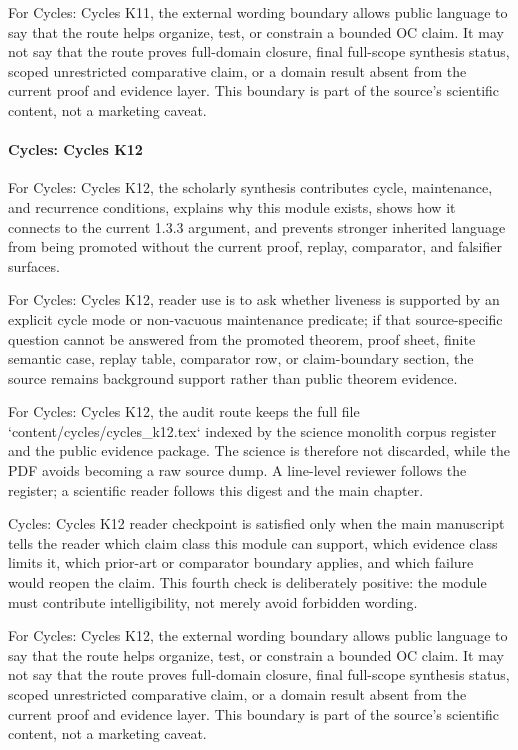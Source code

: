 For Cycles: Cycles K11, the external wording boundary allows public language to say that the route helps organize, test, or constrain a bounded OC claim. It may not say that the route proves full-domain closure, final full-scope synthesis status, scoped unrestricted comparative claim, or a domain result absent from the current proof and evidence layer. This boundary is part of the source's scientific content, not a marketing caveat.


\paragraph{Cycles: Cycles K12}

For Cycles: Cycles K12, the scholarly synthesis contributes cycle, maintenance, and recurrence conditions, explains why this module exists, shows how it connects to the current 1.3.3 argument, and prevents stronger inherited language from being promoted without the current proof, replay, comparator, and falsifier surfaces.


For Cycles: Cycles K12, reader use is to ask whether liveness is supported by an explicit cycle mode or non-vacuous maintenance predicate; if that source-specific question cannot be answered from the promoted theorem, proof sheet, finite semantic case, replay table, comparator row, or claim-boundary section, the source remains background support rather than public theorem evidence.


For Cycles: Cycles K12, the audit route keeps the full file `content/cycles/cycles\_k12.tex` indexed by the science monolith corpus register and the public evidence package. The science is therefore not discarded, while the PDF avoids becoming a raw source dump. A line-level reviewer follows the register; a scientific reader follows this digest and the main chapter.


Cycles: Cycles K12 reader checkpoint is satisfied only when the main manuscript tells the reader which claim class this module can support, which evidence class limits it, which prior-art or comparator boundary applies, and which failure would reopen the claim. This fourth check is deliberately positive: the module must contribute intelligibility, not merely avoid forbidden wording.


For Cycles: Cycles K12, the external wording boundary allows public language to say that the route helps organize, test, or constrain a bounded OC claim. It may not say that the route proves full-domain closure, final full-scope synthesis status, scoped unrestricted comparative claim, or a domain result absent from the current proof and evidence layer. This boundary is part of the source's scientific content, not a marketing caveat.


